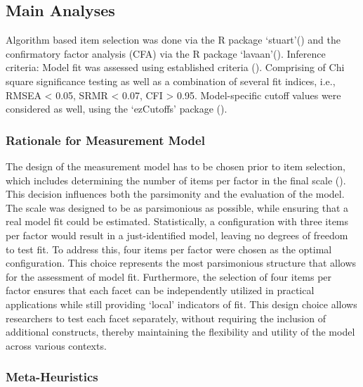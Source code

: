 \documentclass[
  12pt,
  a4paper,
  twoside]{article}
\begin{document}
\subsection{Main Analyses}\label{main-analyses}

Algorithm based item selection was done via the R package `stuart'() and the confirmatory factor analysis (CFA) via the R package `lavaan'(). Inference criteria: Model fit was assessed using established criteria (). Comprising of Chi square significance testing as well as a combination of several fit indices, i.e., RMSEA \textless{} 0.05, SRMR \textless{} 0.07, CFI \textgreater{} 0.95. Model-specific cutoff values were considered as well, using the `ezCutoffs' package ().

\subsubsection{Rationale for Measurement Model}\label{rationale-for-measurement-model}

The design of the measurement model has to be chosen prior to item selection, which includes determining the number of items per factor in the final scale (). This decision influences both the parsimonity and the evaluation of the model. The scale was designed to be as parsimonious as possible, while ensuring that a real model fit could be estimated. Statistically, a configuration with three items per factor would result in a just-identified model, leaving no degrees of freedom to test fit. To address this, four items per factor were chosen as the optimal configuration. This choice represents the most parsimonious structure that allows for the assessment of model fit.
Furthermore, the selection of four items per factor ensures that each facet can be independently utilized in practical applications while still providing `local' indicators of fit. This design choice allows researchers to test each facet separately, without requiring the inclusion of additional constructs, thereby maintaining the flexibility and utility of the model across various contexts.

\subsubsection{Meta-Heuristics}\label{meta-heuristics}
\end{document}
